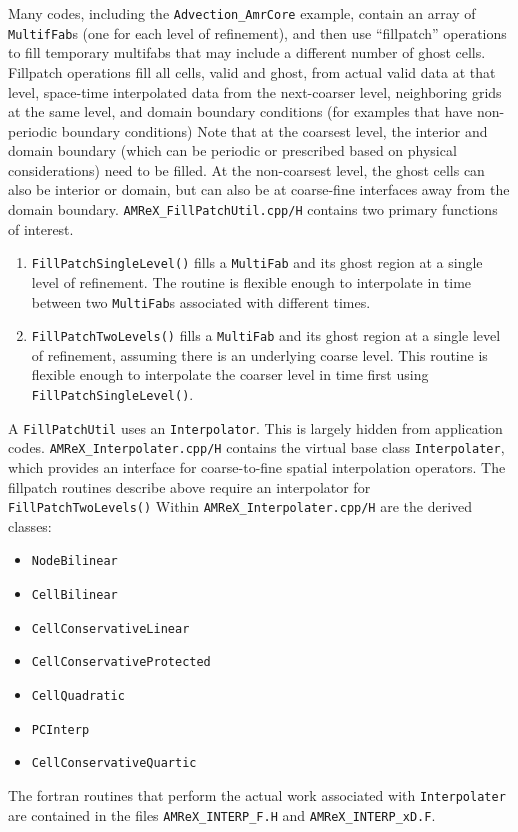 Many codes, including the {\tt Advection\_AmrCore} example, contain an array of {\tt MultifFab}s
(one for each level of refinement), and then use ``fillpatch'' operations to fill temporary
multifabs that may include a different number of ghost cells.  Fillpatch operations fill
all cells, valid and ghost, from actual valid data at that level, space-time interpolated data 
from the next-coarser level, neighboring grids at the same level, and domain
boundary conditions (for examples that have non-periodic boundary conditions)
Note that at the coarsest level,
the interior and domain boundary (which can be periodic or prescribed based on physical considerations)
need to be filled.  At the non-coarsest level, the ghost cells can also be interior or domain,
but can also be at coarse-fine interfaces away from the domain boundary.
{\tt AMReX\_FillPatchUtil.cpp/H} contains two primary functions of interest.
\begin{enumerate}
\item {\tt FillPatchSingleLevel()} fills a {\tt MultiFab} and its ghost region at a single level of 
refinement.  The routine is flexible enough to interpolate in time between two {\tt MultiFab}s
associated with different times.
\item {\tt FillPatchTwoLevels()} fills a {\tt MultiFab} and its ghost region at a single level of 
refinement, assuming there is an underlying coarse level.  This routine is flexible enough to interpolate
the coarser level in time first using {\tt FillPatchSingleLevel()}.
\end{enumerate}

A {\tt FillPatchUtil} uses an {\tt Interpolator}.  This is largely hidden from application codes.
{\tt AMReX\_Interpolater.cpp/H} contains the virtual base class {\tt Interpolater}, which provides
an interface for coarse-to-fine spatial interpolation operators.  The fillpatch routines describe
above require an interpolator for {\tt FillPatchTwoLevels()}
Within {\tt AMReX\_Interpolater.cpp/H} are the derived classes:
\begin{itemize}
\item {\tt NodeBilinear}
\item {\tt CellBilinear}
\item {\tt CellConservativeLinear}
\item {\tt CellConservativeProtected}
\item {\tt CellQuadratic}
\item {\tt PCInterp}
\item {\tt CellConservativeQuartic}
\end{itemize}
The fortran routines that perform the actual work associated with {\tt Interpolater} are 
contained in the files {\tt AMReX\_INTERP\_F.H} and {\tt AMReX\_INTERP\_xD.F}.

